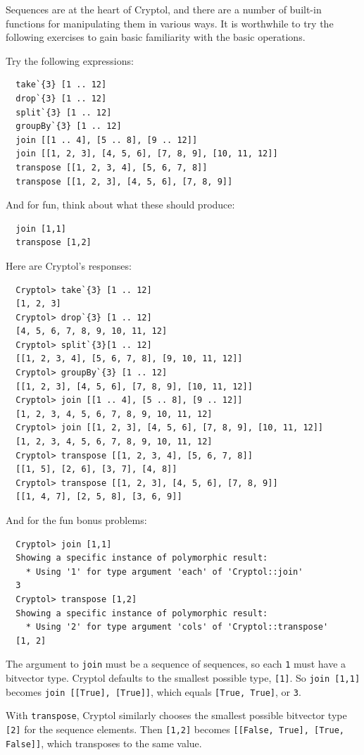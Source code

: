 Sequences are at the heart of Cryptol, and there are a number of
built-in functions for manipulating them in various ways.  It is
worthwhile to try the following exercises to gain basic familiarity
with the basic operations.

\begin{Exercise}\label{ex:seq:11}
Try the following expressions:\indTake\indDrop\indSplit\indGroup\indJoin\indTranspose
\begin{Verbatim}
  take`{3} [1 .. 12]
  drop`{3} [1 .. 12]
  split`{3} [1 .. 12]
  groupBy`{3} [1 .. 12]
  join [[1 .. 4], [5 .. 8], [9 .. 12]]
  join [[1, 2, 3], [4, 5, 6], [7, 8, 9], [10, 11, 12]]
  transpose [[1, 2, 3, 4], [5, 6, 7, 8]]
  transpose [[1, 2, 3], [4, 5, 6], [7, 8, 9]]
\end{Verbatim}
And for fun, think about what these should produce:
\begin{Verbatim}
  join [1,1]
  transpose [1,2]
\end{Verbatim}
\end{Exercise}
\begin{Answer}
Here are Cryptol's responses:
\begin{Verbatim}
  Cryptol> take`{3} [1 .. 12]
  [1, 2, 3]
  Cryptol> drop`{3} [1 .. 12]
  [4, 5, 6, 7, 8, 9, 10, 11, 12]
  Cryptol> split`{3}[1 .. 12]
  [[1, 2, 3, 4], [5, 6, 7, 8], [9, 10, 11, 12]]
  Cryptol> groupBy`{3} [1 .. 12]
  [[1, 2, 3], [4, 5, 6], [7, 8, 9], [10, 11, 12]]
  Cryptol> join [[1 .. 4], [5 .. 8], [9 .. 12]]
  [1, 2, 3, 4, 5, 6, 7, 8, 9, 10, 11, 12]
  Cryptol> join [[1, 2, 3], [4, 5, 6], [7, 8, 9], [10, 11, 12]]
  [1, 2, 3, 4, 5, 6, 7, 8, 9, 10, 11, 12]
  Cryptol> transpose [[1, 2, 3, 4], [5, 6, 7, 8]]
  [[1, 5], [2, 6], [3, 7], [4, 8]]
  Cryptol> transpose [[1, 2, 3], [4, 5, 6], [7, 8, 9]]
  [[1, 4, 7], [2, 5, 8], [3, 6, 9]]
\end{Verbatim}
And for the fun bonus problems:
\begin{Verbatim}
  Cryptol> join [1,1]
  Showing a specific instance of polymorphic result:
    * Using '1' for type argument 'each' of 'Cryptol::join'
  3
  Cryptol> transpose [1,2]
  Showing a specific instance of polymorphic result:
    * Using '2' for type argument 'cols' of 'Cryptol::transpose'
  [1, 2]
\end{Verbatim}
The argument to \texttt{join} must be a sequence of sequences, so each
\texttt{1} must have a bitvector type. Cryptol defaults to the
smallest possible type, \texttt{[1]}. So \texttt{join [1,1]} becomes
\texttt{join [[True], [True]]}, which equals \texttt{[True, True]}, or
\texttt{3}.

With \texttt{transpose}, Cryptol similarly chooses the smallest
possible bitvector type \texttt{[2]} for the sequence elements. Then
\texttt{[1,2]} becomes \texttt{[[False, True], [True, False]]}, which
transposes to the same value.
\end{Answer}

